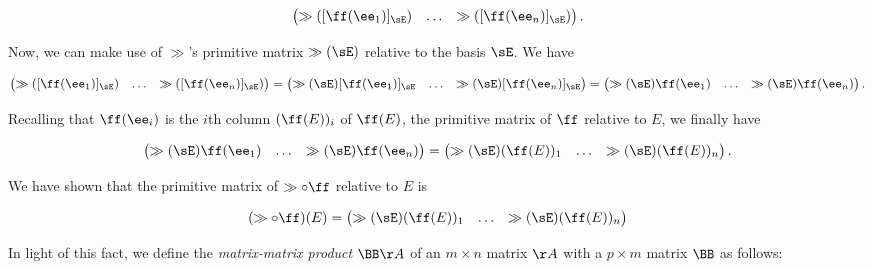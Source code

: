 \begin{defn}
    \begin{align*}
        \begin{pmatrix}
            \gg([\ff(\ee_1)]_\sE) & \hdots & \gg([\ff(\ee_n)]_\sE)
        \end{pmatrix}.
    \end{align*}
    
    Now, we can make use of $\gg$'s primitive matrix $\gg(\sE)$ relative to the basis $\sE$. We have
    
    \begin{align*}
        \begin{pmatrix}
            \gg([\ff(\ee_1)]_\sE) & \hdots & \gg([\ff(\ee_n)]_\sE)
        \end{pmatrix}
        =
        \begin{pmatrix}
            \gg(\sE) [\ff(\ee_1)]_\sE & \hdots & \gg(\sE) [\ff(\ee_n)]_\sE
        \end{pmatrix}
        =
        \begin{pmatrix}
            \gg(\sE) \ff(\ee_1) & \hdots & \gg(\sE) \ff(\ee_n)
        \end{pmatrix}.
    \end{align*}
    
    Recalling that $\ff(\ee_i)$ is the $i$th column $(\ff(E))_i$ of $\ff(E)$, the primitive matrix of $\ff$ relative to $E$, we finally have
    
    \begin{align*}
        \begin{pmatrix}
            \gg(\sE) \ff(\ee_1) & \hdots & \gg(\sE) \ff(\ee_n)
        \end{pmatrix}
        =
        \begin{pmatrix} 
            \gg(\sE) (\ff(E))_1 & \hdots & \gg(\sE) (\ff(E))_n
        \end{pmatrix}.
    \end{align*}
    
    We have shown that the primitive matrix of $\gg \circ \ff$ relative to $E$ is
    
    \begin{align*}
        (\gg \circ \ff)(E) = 
        \begin{pmatrix} 
            \gg(\sE) (\ff(E))_1 & \hdots & \gg(\sE) (\ff(E))_n
        \end{pmatrix}
    \end{align*}
    
    In light of this fact, we define the \textit{matrix-matrix product} $\BB \AA$ of an $m \times n$ matrix $\AA$ with a $p \times m$ matrix $\BB$ as follows:
    

\end{defn}
